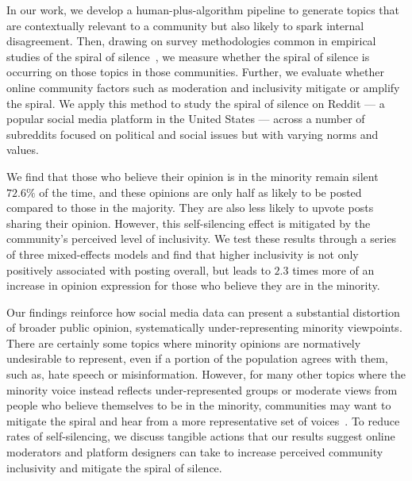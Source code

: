 In our work, we develop a human-plus-algorithm pipeline to generate topics that are contextually relevant to a community but also likely to spark internal disagreement. Then, drawing on survey methodologies common in empirical studies of the spiral of silence~\cite{matthes2018spiral}, we measure whether the spiral of silence is occurring on those topics in those communities. Further, we evaluate whether online community factors such as moderation and inclusivity mitigate or amplify the spiral. We apply this method to study the spiral of silence on Reddit --- a popular social media platform in the United States --- across a number of subreddits focused on political and social issues but with varying norms and values.  

We find that those who believe their opinion is in the minority remain silent $72.6\%$ of the time, and these opinions are only half as likely to be posted compared to those in the majority. They are also less likely to upvote posts sharing their opinion. However, this self-silencing effect is mitigated by the community's perceived level of inclusivity. We test these results through a series of three mixed-effects models and find that higher inclusivity is not only positively associated with posting overall, but leads to $2.3$ times more of an increase in opinion expression for those who believe they are in the minority. 


Our findings reinforce how social media data can present a substantial distortion of broader public opinion, systematically under-representing minority viewpoints. There are certainly some topics where minority opinions are normatively undesirable to represent, even if a portion of the population agrees with them, such as, hate speech or misinformation. However, for many other topics where the minority voice instead reflects under-represented groups or moderate views from people who believe themselves to be in the minority, communities may want to mitigate the spiral and hear from a more representative set of voices~\cite{farjam2024social,bowen2003spirals}. To reduce rates of self-silencing, we discuss tangible actions that our results suggest online moderators and platform designers can take to increase perceived community inclusivity and mitigate the spiral of silence.